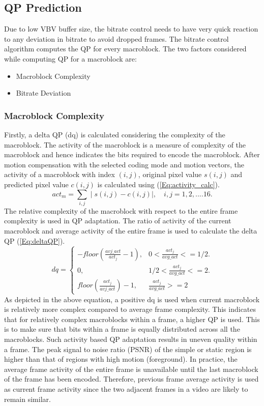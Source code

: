 \documentclass[11pt]{article} %
\begin{document}
\subsection{QP Prediction}  \label{used QP prediction overview}
  Due to low VBV buffer size, the bitrate control needs to have very quick reaction to any deviation in bitrate to avoid dropped frames. The bitrate control algorithm computes the QP for every macroblock. The two factors considered while computing QP for a macroblock are:
  
\begin{itemize}  
\item Macroblock Complexity
\item Bitrate Deviation
\end{itemize}
\subsubsection{Macroblock Complexity}	
	Firstly, a delta QP (dq) is calculated considering the complexity of the macroblock. The activity of the macroblock is a measure of complexity of the macroblock and hence indicates the bits required to encode the macroblock. After motion compensation with the selected coding mode and motion vectors, the activity of a macroblock with index $(i,j)$, original pixel value $s(i,j)$ and predicted pixel value $c(i,j)$ is calculated using (\ref{Eq:activity_calc}). 
\begin{equation}
	\label{Eq:activity_calc}
	act_m = \sum_{i,j} \mid s(i,j)-c(i,j) \mid ,\quad	i,j = 1,2,....16.
\end{equation}	
	 The relative complexity of the macroblock with respect to the entire frame complexity is used in QP adaptation. The ratio of activity of the current macroblock and average activity of the entire frame is used to calculate the delta QP (\ref{Eq:deltaQP}).
\begin{equation}
	\label{Eq:deltaQP}
	dq = \begin{cases}
		-floor(\frac{avj\_act} {act_j} - 1), &  0 < \frac{act_j}{avg\_act} <= 1/2.\\
		0, & 1/2 < \frac{act_j}{avg\_act} <= 2.\\
		floor(\frac{act_j} {avj\_act}) - 1, & \frac{act_j}{avg\_act} >= 2
	\end{cases}
\end{equation}
As depicted in the above equation, a positive dq is used when current macroblock is relatively more complex compared to average frame complexity. This indicates that for relatively complex macroblocks within a frame, a higher QP is used. This is to make sure that bits within a frame is equally distributed across all the macroblocks. Such activity based QP adaptation results in uneven quality within a frame. The peak signal to noise ratio (PSNR) of the simple or static region is higher than that of regions with high motion (foreground). In practice, the average frame activity of the entire frame is unavailable until the last macroblock of the frame has been encoded. Therefore, previous frame average activity is used as current frame activity since the two adjacent frames in a video are likely to remain similar. 
\end{document}
